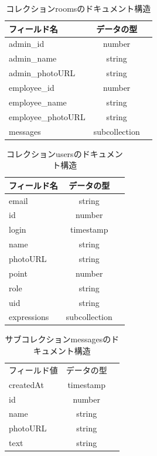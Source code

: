 \begin{table}[hbtp]
  \caption{コレクションroomsのドキュメント構造}
  \label{table:data_type}
  \centering
  \begin{tabular}{|l|c|r|} \hline
    フィールド名  & データの型   \\ \hline
    admin\_id  & number  \\ 
    admin\_name  & string   \\
    admin\_photoURL  &  string \\
    employee\_id  & number  \\ 
    employee\_name  & string   \\
    employee\_photoURL  &  string \\
    messages  &  subcollection \\ \hline
  \end{tabular}
\end{table}

\begin{table}[hbtp]
  \caption{コレクションusersのドキュメント構造}
  \label{table:data_type}
  \centering
  \begin{tabular}{|l|c|r|} \hline
    フィールド名  & データの型   \\ \hline
    email  & string   \\  
    id  & number   \\ 
    login  & timestamp  \\ 
    name  &  string  \\ 
    photoURL  &  string  \\ 
    point  &  number  \\ 
    role  &  string  \\ 
    uid  &  string  \\ 
    expressions  &  subcollection  \\ 
    \hline
  \end{tabular}
\end{table}

\begin{table}[hbtp]
  \caption{サブコレクションmessagesのドキュメント構造}
  \label{table:data_type}
  \centering
  \begin{tabular}{|l|c|r|} \hline
    フィールド値  & データの型  \\
    createdAt  & timestamp \\
    id  & number  \\
    name  & string  \\
    photoURL  &  string \\
    text  &  string \\ \hline
  \end{tabular}
\end{table}

